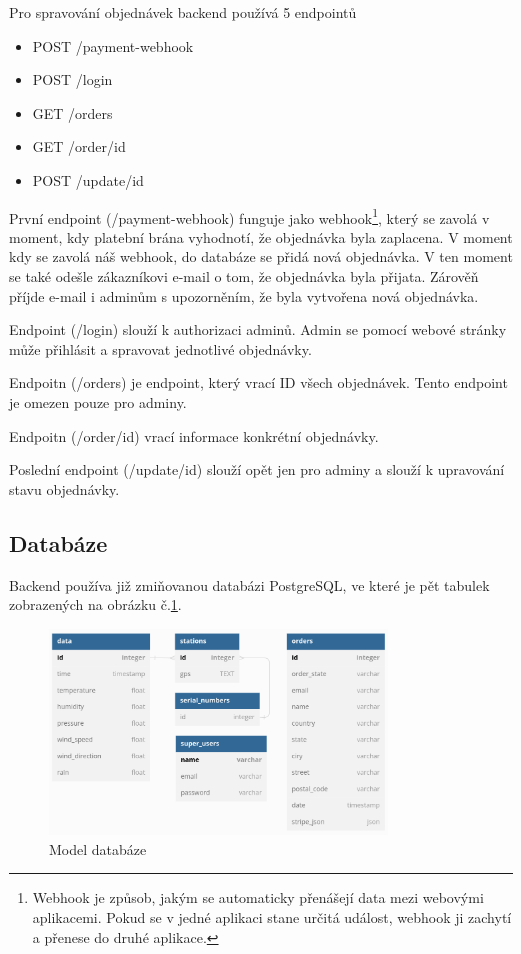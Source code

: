Pro spravování objednávek backend používá 5 endpointů
\begin{itemize}
  \item POST /payment-webhook
  \item POST /login
  \item GET /orders
  \item GET /order/{id}
  \item POST /update/{id}
\end{itemize}
První endpoint (/payment-webhook) funguje jako webhook\footnote{Webhook je způsob, jakým se automaticky přenášejí data mezi webovými aplikacemi.
Pokud se v jedné aplikaci stane určitá událost, webhook ji zachytí a přenese do druhé aplikace.},
který se zavolá v moment, kdy platební brána vyhodnotí, že objednávka byla zaplacena. V moment kdy se zavolá náš webhook, do databáze se přidá nová objednávka. 
V ten moment se také odešle zákazníkovi e-mail o tom, že objednávka byla přijata. Zárověň příjde e-mail i adminům s upozorněním, že byla vytvořena nová objednávka.

Endpoint (/login) slouží k authorizaci adminů. Admin se pomocí webové stránky může přihlásit a spravovat jednotlivé objednávky.

Endpoitn (/orders) je endpoint, který vrací ID všech objednávek. Tento endpoint je omezen pouze pro adminy.

Endpoitn (/order/{id}) vrací informace konkrétní objednávky.

Poslední endpoint (/update/{id}) slouží opět jen pro adminy a slouží k upravování stavu objednávky.

\subsection{Databáze}
Backend používa již zmiňovanou databázi PostgreSQL, ve které je pět tabulek zobrazených na obrázku č.\ref{model_databaze}.
\begin{figure}[h] 
    \centering
    \includegraphics[width=0.8\textwidth]{images/database_diagram.png}
    \caption{Model databáze}
    \label{model_databaze}
\end{figure}
